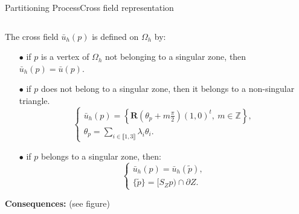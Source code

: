 \documentclass[compress,10pt,aspectratio=169]{beamer}
\begin{document}
\begin{frame}{Partitioning Process}{Cross field representation}
\begin{columns}
    \begin{column}{0.72\textwidth}
    \vspace{-0.1cm}
        \small
The cross field $\bar{u}_h(p)$ is defined on $\Omega_h$ by:
\begin{itemize}
\item[$\bullet$] if $p$ is a vertex of $\Omega_h$ not belonging to a singular zone, then $\bar{u}_h(p)=\bar{u}(p)$.\\%
\item[$\bullet$] if $p$ does not belong to a singular zone, then it belongs to a non-singular triangle.
$$
\left\{
\begin{array}{l}
\bar{u}_h(p)=\displaystyle\left\{\mathbf{R}\left(\theta_p+m\frac{\pi}{2}\right)(1,0)^t,~m\in\mathbb{Z}\right\},\\[0.2cm]
\theta_p=\sum_{i\in\llbracket1, 3\rrbracket}\lambda_i\theta_i.
\end{array}
\right.
$$
\item[$\bullet$] if $p$ belongs to a singular zone, then:
\begin{equation*}
\label{eqn:etoilage}
\left\{
\begin{array}{l}
\bar{u}_h(p)=\bar{u}_h(\widetilde{p}),\\[0.2cm]
\{\widetilde{p}\}=[S_Zp)\cap\partial Z.
\end{array}
\right.
\end{equation*}
\end{itemize}
\vspace{-0.15cm}
\textbf{Consequences:} (see figure)
\vspace{0.2cm}
\end{column}


\end{columns}
\end{frame}
\end{document}
